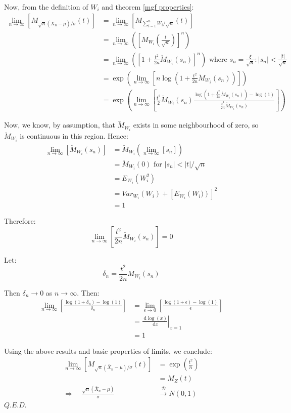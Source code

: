 \documentclass[12pt,a4paper]{article}
\newcommand{\diff}{\;\mathrm{d}}
\begin{document}
Now, from the definition of $W_i$ and theorem \ref{mgf properties}:
\begin{align*}
\lim_{n\to\infty}\left[M_{\sqrt{n}\left(\bar{X}_n-\mu\right)/\sigma}(t)\right] &= \lim_{n\to\infty}\left[M_{\sum\limits_{i=1}^n W_i/\sqrt{n}}(t)\right]\\
&= \lim_{n\to\infty}\left(\left[M_{W_i}\left(\frac{t}{\sqrt{n}}\right)\right]^n\right)\\
&= \lim_{n\to\infty}\left(\left[1+\frac{t^2}{2n}\ddot{M}_{W_i}(s_n)\right]^n\right) \mbox{ where $s_n = \frac{\xi}{\sqrt{n}}: |s_n| < \frac{|t|}{\sqrt{n}}$}\\
&= \exp\left(\lim_{n\to\infty}\left[n\log\left(1 + \frac{t^2}{2n}\ddot{M}_{W_i}(s_n)\right)\right]\right)\\
&= \exp\left(\lim_{n\to\infty}\left[\frac{t^2}{2}\ddot{M}_{W_i}(s_n)\frac{\log\left(1+\frac{t^2}{2n}\ddot{M}_{W_i}(s_n)\right) - \log(1)}{\frac{t^2}{2n}\ddot{M}_{W_i}(s_n)}\right]\right)
\end{align*}

Now, we know, by assumption, that $\dddot{M}_{W_i}$ exists in some neighbourhood of zero, so $\ddot{M}_{W_i}$ is continuous in this region. Hence:
\begin{align*}
\lim_{n\to\infty}\left[\ddot{M}_{W_i}(s_n)\right] &= \ddot{M}_{W_i}\left(\lim_{n\to\infty}[s_n]\right)\\
&= \ddot{M}_{W_i}(0) \mbox{ for $|s_n| < |t|/\sqrt{n}$}\\
&= E_{W_i}\left(W_i^2\right)\\
&= Var_{W_i}\left(W_i\right) + \left[E_{W_i}\left(W_i)\right)\right]^2\\
&= 1
\end{align*}

Therefore:
$$\lim_{n\to\infty}\left[\frac{t^2}{2n}\ddot{M}_{W_i}(s_n)\right] = 0$$

Let:
$$\delta_n = \frac{t^2}{2n}\ddot{M}_{W_i}(s_n)$$

Then $\delta_n \to 0$ as $n\to\infty$. Then:
\begin{align*}
\lim_{n\to\infty}\left[\frac{\log\left(1+\delta_n\right) - \log(1)}{\delta_n}\right] &= \lim_{\epsilon\to 0}\left[\frac{\log\left(1+\epsilon\right)-\log(1)}{\epsilon}\right]\\
&= \left.\frac{\diff \log(x)}{\diff x}\right|_{x=1}\\
&= 1
\end{align*}

Using the above results and basic properties of limits, we conclude:
\begin{align*}
\lim_{n\to\infty}\left[M_{\sqrt{n}\left(\bar{X}_n-\mu\right)/\sigma}(t)\right] &= \exp\left(\frac{t^2}{n}\right)\\
&= M_Z(t)\\
\Rightarrow\quad \frac{\sqrt{n}\left(\bar{X}_n-\mu\right)}{\sigma} &\xrightarrow{\mathscr{D}} N(0,1)
\end{align*}\hfill$Q.E.D.$
\end{document}
